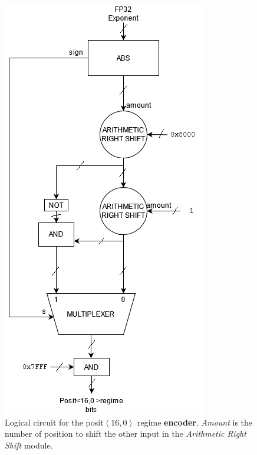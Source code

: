\begin{figure}
    \centering
    \includegraphics[width=0.5\linewidth]{img/regime_encoder.png}
    \caption{Logical circuit for the posit$\left<16,0\right>$ regime \textbf{encoder}. \textit{Amount} is the number of position to shift the other input in the \textit{Arithmetic Right Shift} module.}
    \label{fig:fp_exp_reg_encoder}
\end{figure}



